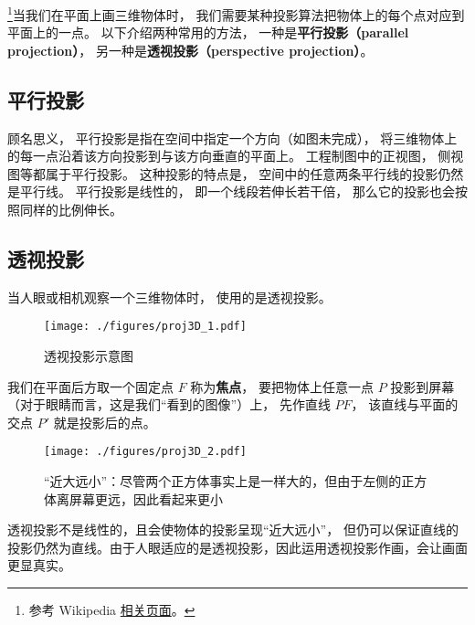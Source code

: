 
\begin{issues}
\issueTODO
\end{issues}

\footnote{参考 Wikipedia \href{https://en.wikipedia.org/wiki/3D_projection}{相关页面}。}当我们在平面上画三维物体时， 我们需要某种投影算法把物体上的每个点对应到平面上的一点。 以下介绍两种常用的方法， 一种是\textbf{平行投影（parallel projection）}， 另一种是\textbf{透视投影（perspective projection）}。


\subsection{平行投影}
顾名思义， 平行投影是指在空间中指定一个方向（如图未完成）， 将三维物体上的每一点沿着该方向投影到与该方向垂直的平面上。 工程制图中的正视图， 侧视图等都属于平行投影。 这种投影的特点是， 空间中的任意两条平行线的投影仍然是平行线。 平行投影是线性的， 即一个线段若伸长若干倍， 那么它的投影也会按照同样的比例伸长。

\subsection{透视投影}
当人眼或相机观察一个三维物体时， 使用的是透视投影。
\begin{figure}[ht]
\centering
\texttt{[image: ./figures/proj3D\_1.pdf]}
\caption{透视投影示意图} \label{proj3D_fig1}
\end{figure}

我们在平面后方取一个固定点 $F$ 称为\textbf{焦点}， 要把物体上任意一点 $P$ 投影到屏幕（对于眼睛而言，这是我们“看到的图像”）上， 先作直线 $PF$， 该直线与平面的交点 $P'$ 就是投影后的点。 

\begin{figure}[ht]
\centering
\texttt{[image: ./figures/proj3D\_2.pdf]}
\caption{“近大远小”：尽管两个正方体事实上是一样大的，但由于左侧的正方体离屏幕更远，因此看起来更小} \label{proj3D_fig2}
\end{figure}

透视投影不是线性的，且会使物体的投影呈现“近大远小”， 但仍可以保证直线的投影仍然为直线。由于人眼适应的是透视投影，因此运用透视投影作画，会让画面更显真实。

